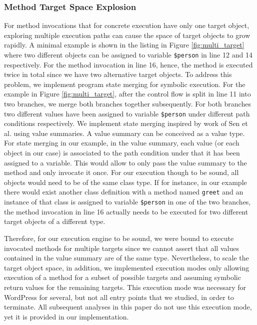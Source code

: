 \documentclass[sigconf, preprint]{acmart}
\renewcommand{\sf}[1]{\textsf{#1}}
\renewcommand{\tt}[1]{\texttt{#1}}
\begin{document}
\subsubsection{Method Target Space Explosion}
For method invocations that for concrete execution have only one target object,
exploring multiple execution paths can cause the space of target objects to
grow rapidly. A minimal example is shown in the listing in Figure
\ref{fig:multi_target} where two different objects can be assigned to variable \tt{\$person} in line 12 and
14 respectively. For the method invocation in line 16, hence, the method is
executed twice in total since we have two alternative target objects. To address this problem, we
implement program state merging for symbolic execution. For the example in
Figure \ref{fig:multi_target}, after the control flow is split in line 11 into
two branches, we merge both branches together subsequently. For both branches two different
values have been assigned to variable \tt{\$person} under different path
conditions respectively. We implement state merging inspired by work of Sen et al. 
\cite{Sen:2015:MMS:2786805.2786830} using value summaries. A value summary can be conceived as a value
type. For state merging in our example, in the value summary, each value (or
each object in our case) is associated to the path condition under that it has
been assigned to a variable. This would allow to only pass the value summary to
the method and only invocate it once. For our execution though to be sound, all
objects would need to be of the same class type. If for instance, in our
example there would exist another class definition with a method named
\tt{greet} and an instance of that class is assigned to variable \tt{\$person}
in one of the two branches, the method invocation in line 16 actually needs to be
executed for two different target objects of a different type.

Therefore, for our execution engine to be sound, we were bound to execute
invocated methods for multiple targets since we cannot assert that all values
contained in the value summary are of the same type. Nevertheless, to scale the
target object space, in addition, we implemented execution modes only allowing
execution of a method for a subset of possible targets and assuming symbolic
return values for the remaining targets. This execution mode was necessary for
\sf{WordPress} for several, but not all entry points that we studied, in order
to terminate. All subsequent analyses in this paper do not use this execution
mode, yet it is provided in our implementation.
\end{document}
